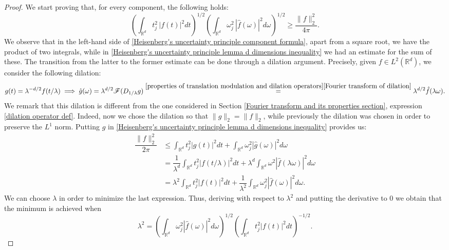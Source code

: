\documentclass[corpo=11pt, stile=classica, tipotesi=custom,
greek, evenboxes, english]{toptesi}
\numberwithin{equation}{chapter}
\theoremstyle{definition}
\theoremstyle{remark}
\newcommand{\R}{\mathbb{R}} %
\newcommand{\F}{\mathscr{F}} %
\begin{document}
\begin{proof}
	We start proving that, for every component, the following holds:
	\begin{equation}\label{Heisenberg's uncertainty principle component formula}
		\left( \int_{\R^d} t_j^2\, |f(t)|^2dt \right)^{1/2} \left( \int_{\R^d} \omega_j^2\, |\hat{f}(\omega)|^2 d\omega \right)^{1/2} \geq \dfrac{\|f\|_2^2}{4\pi}.
	\end{equation} We observe that in the left-hand side of \eqref{Heisenberg's uncertainty principle component formula}, apart from a square root, we have the product of two integrals, while in \eqref{Heisenberg's uncertainty principle lemma d dimensions inequality} we had an estimate for the sum of these. The transition from the latter to the former estimate can be done through a dilation argument. Precisely, given $f \in L^2(\R^d)$, we consider the following dilation:
	\begin{equation*}
		g(t) = \lambda^{-d/2}f(t/\lambda) \implies \hat{g}(\omega) = \lambda^{d/2} \F(D_{1/\lambda}g) \overset{\ref{properties of translation modulation and dilation operators}\ref{Fourier transform of dilation}}{=} \lambda^{d/2} \hat{f}(\lambda \omega).
	\end{equation*}
	We remark that this dilation is different from the one considered in Section \ref{Fourier transform and its properties section}, expression \eqref{dilation operator def}. Indeed, now we chose the dilation so that $\|g\|_2 = \|f\|_2$, while previously the dilation was chosen in order to preserve the $L^1$ norm. Putting $g$ in \eqref{Heisenberg's uncertainty principle lemma d dimensions inequality} provides us:
	\begin{align}\label{Heisenberg's uncertainty principle inequality 1}
		\dfrac{\|f\|_2^2}{2\pi} &\leq \int_{\R^d} t_j^2 |g(t)|^2dt + \int_{\R^d} \omega_j^2 |\hat{g}(\omega)|^2d\omega \\
								&= \dfrac{1}{\lambda^d} \int_{\R^d} t_j^2 |f(t/\lambda)|^2dt  + \lambda^d \int_{\R^d} \omega^2 |\hat{f}(\lambda \omega)|^2d\omega \nonumber \\
								&= \lambda^2 \int_{\R^d} t_j^2 |f(t)|^2dt + \dfrac{1}{\lambda^2} \int_{\R^d} \omega_j^2 |\hat{f}(\omega)|^2d\omega. \nonumber
	\end{align}
	We can choose $\lambda$ in order to minimize the last expression. Thus, deriving with respect to $\lambda^2$ and putting the derivative to 0 we obtain that the minimum is achieved when 
	\begin{equation}\label{Heisenberg's uncertainty principle lambda}
		\lambda^2 = \left(\int_{\R^d} \omega_j^2 |\hat{f}(\omega)|^2d\omega\right)^{1/2} \left(\int_{\R^d} t_j^2 |f(t)|^2dt\right)^{-1/2}.

\end{equation}
\end{proof}
\end{document}
